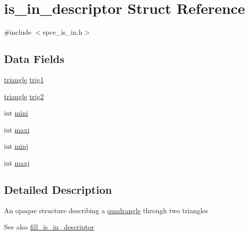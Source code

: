 \hypertarget{structis__in__descriptor}{
\section{is\_\-in\_\-descriptor Struct Reference}
\label{structis__in__descriptor}
}


{\ttfamily \#include $<$spce\_\-is\_\-in.h$>$}\subsection*{Data Fields}
\begin{DoxyCompactItemize}
\item 
\hyperlink{structtriangle}{triangle} \hyperlink{structis__in__descriptor_abc9206751643a78624d922bef124d5d4}{trig1}
\item 
\hyperlink{structtriangle}{triangle} \hyperlink{structis__in__descriptor_a59780588f236998e85b24336f7b42e77}{trig2}
\item 
int \hyperlink{structis__in__descriptor_a26eea466eae68c2db0ee31c356c61b35}{mini}
\item 
int \hyperlink{structis__in__descriptor_ae6c942a4bb8ef1f46b1f26eaeba0ed8b}{maxi}
\item 
int \hyperlink{structis__in__descriptor_a36bdf91daf9a1665e82127927e7595cc}{minj}
\item 
int \hyperlink{structis__in__descriptor_a8bfe4871e431c3415f16c79a0e9d1752}{maxj}
\end{DoxyCompactItemize}


\subsection{Detailed Description}
An opaque structure describing a \hyperlink{structquadrangle}{quadrangle} through two triangles \begin{DoxySeeAlso}{See also}
\hyperlink{spce__is__in_8h_aea6b944b77bec44a66189391cdeeada1}{fill\_\-is\_\-in\_\-descriptor} 
\end{DoxySeeAlso}


